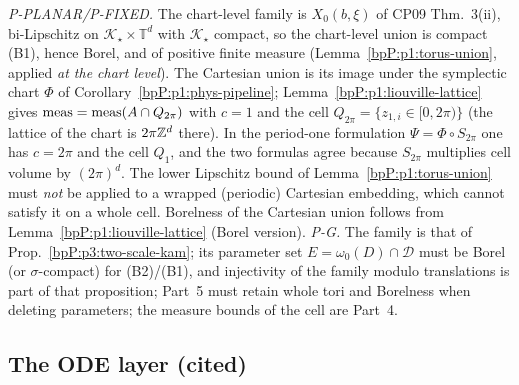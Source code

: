 \begin{remark}[Use]\label{bpP:p1:measure-use}
\emph{P-PLANAR/P-FIXED.} The chart-level family is $X_0(b,\xi)$ of CP09 Thm.~3(ii), bi-Lipschitz on $\mathcal K_\star\times\mathbb T^d$ with $\mathcal K_\star$ compact, so the chart-level union is compact (B1), hence Borel, and of positive finite measure (Lemma~\ref{bpP:p1:torus-union}, applied \emph{at the chart level}). The Cartesian union is its image under the symplectic chart $\Phi$ of Corollary~\ref{bpP:p1:phys-pipeline}; Lemma~\ref{bpP:p1:liouville-lattice} gives $\operatorname{meas}=\operatorname{meas}(A\cap Q_{2\pi})$ with $c=1$ and the cell $Q_{2\pi}=\{z_{1,i}\in[0,2\pi)\}$ (the lattice of the chart is $2\pi\mathbb{Z}^d$ there). In the period-one formulation $\Psi=\Phi\circ S_{2\pi}$ one has $c=2\pi$ and the cell $Q_1$, and the two formulas agree because $S_{2\pi}$ multiplies cell volume by $(2\pi)^d$. The lower Lipschitz bound of Lemma~\ref{bpP:p1:torus-union} must \emph{not} be applied to a wrapped (periodic) Cartesian embedding, which cannot satisfy it on a whole cell. Borelness of the Cartesian union follows from Lemma~\ref{bpP:p1:liouville-lattice} (Borel version). \emph{P-G.} The family is that of Prop.~\ref{bpP:p3:two-scale-kam}; its parameter set $E=\omega_0(D)\cap\mathcal D$ must be Borel (or $\sigma$-compact) for (B2)/(B1), and injectivity of the family modulo translations is part of that proposition; Part~5 must retain whole tori and Borelness when deleting parameters; the measure bounds of the cell are Part~4.
\end{remark}

\subsection{The ODE layer (cited)}\label{bpP:p1:ode}

